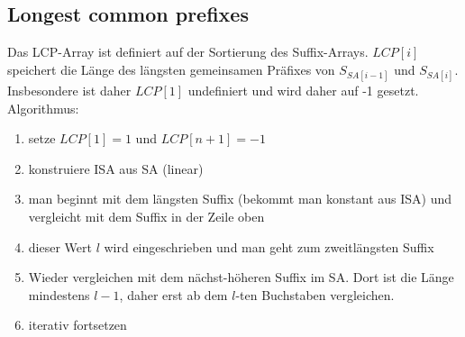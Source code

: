 \documentclass[a4paper, 12pt]{article}
\theoremstyle{plain}
\theoremstyle{definition}
\theoremstyle{lemma}
\theoremstyle{remark}
\theoremstyle{corollary}
\theoremstyle{example}
\begin{document}
	\subsection{Longest common prefixes}
	Das LCP-Array ist definiert auf der Sortierung des Suffix-Arrays. $LCP[i]$ speichert die Länge des längsten gemeinsamen Präfixes von $S_{SA[i-1]}$ und $S_{SA[i]}$. Insbesondere ist daher $LCP[1]$ undefiniert und wird daher auf -1 gesetzt. Algorithmus: \begin{enumerate}
		\item setze $LCP[1] = 1$ und $LCP[n+1] = -1$
		\item konstruiere ISA aus SA (linear)
		\item man beginnt mit dem längsten Suffix (bekommt man konstant aus ISA) und vergleicht mit dem Suffix in der Zeile oben
		\item dieser Wert $l$ wird eingeschrieben und man geht zum zweitlängsten Suffix
		\item Wieder vergleichen mit dem nächst-höheren Suffix im SA. Dort ist die Länge mindestens $l-1$, daher erst ab dem $l$-ten Buchstaben vergleichen.
		\item iterativ fortsetzen
	\end{enumerate}
\end{document}
